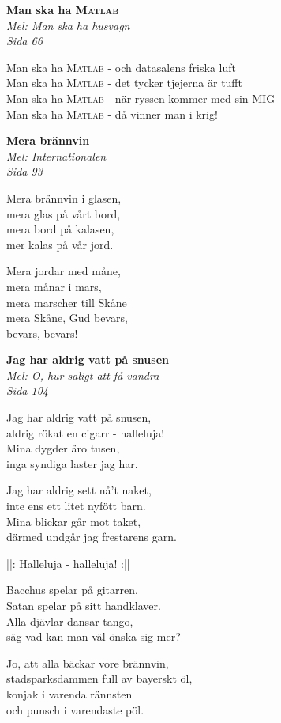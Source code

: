 \documentclass[10pt]{article}
\newenvironment{song}[2]{
	\textbf{#1}\\
	\emph{#2}\par
	\vspace{-1mm}
}{
	\vspace{2mm}
}
\begin{document}
\begin{multicols*}{2}
\begin{song}{Man ska ha \textsc{Matlab}}{Mel: Man ska ha husvagn\\Sida 66}
	Man ska ha \textsc{Matlab} - och datasalens friska luft\\
	Man ska ha \textsc{Matlab} - det tycker tjejerna är tufft\\
	Man ska ha \textsc{Matlab} - när ryssen kommer med sin MIG\\
	Man ska ha \textsc{Matlab} - då vinner man i krig!
\end{song}

\begin{song}{Mera brännvin}{Mel: Internationalen\\Sida 93}
	Mera brännvin i glasen,\\
	mera glas på vårt bord,\\
	mera bord på kalasen,\\
	mer kalas på vår jord.

	Mera jordar med måne,\\
	mera månar i mars,\\
	mera marscher till Skåne\\
	mera Skåne, Gud bevars,\\
	bevars, bevars!
\end{song}

\vfill
\columnbreak


\begin{song}{Jag har aldrig vatt på snusen}{Mel: O, hur saligt att få vandra\\Sida 104}
	Jag har aldrig vatt på snusen,\\
	aldrig rökat en cigarr - halleluja!\\
	Mina dygder äro tusen,\\
	inga syndiga laster jag har.

	Jag har aldrig sett nå't naket,\\
	inte ens ett litet nyfött barn.\\
	Mina blickar går mot taket,\\
	därmed undgår jag frestarens garn.

	||: Halleluja - halleluja! :||

	Bacchus spelar på gitarren,\\
	Satan spelar på sitt handklaver.\\
	Alla djävlar dansar tango,\\
	säg vad kan man väl önska sig mer?

	Jo, att alla bäckar vore brännvin,\\
	stadsparksdammen full av bayerskt öl,\\
	konjak i varenda rännsten\\
	och punsch i varendaste pöl.


\end{song}
\end{multicols*}
\end{document}
